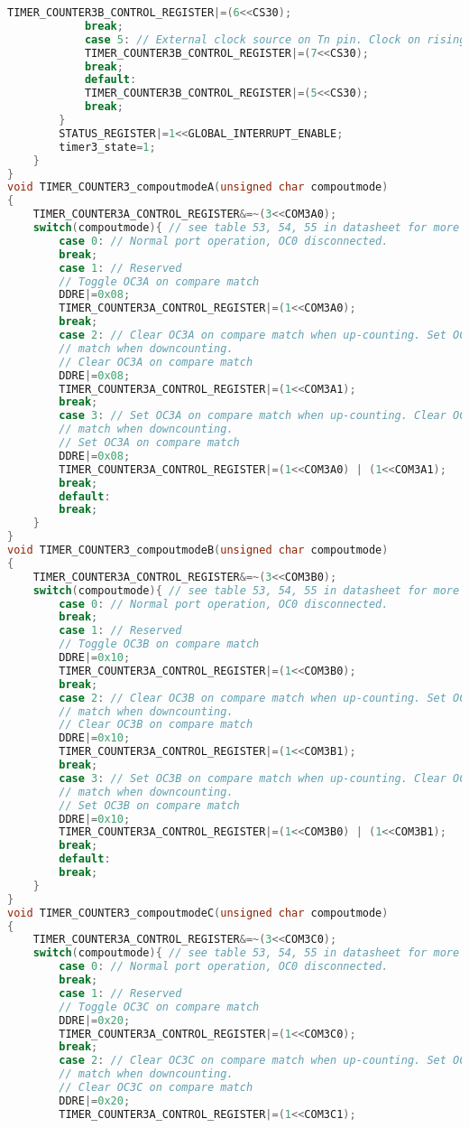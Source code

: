 \begin{lstlisting}[language=C]
			TIMER_COUNTER3B_CONTROL_REGISTER|=(6<<CS30);
			break;
			case 5: // External clock source on Tn pin. Clock on rising edge
			TIMER_COUNTER3B_CONTROL_REGISTER|=(7<<CS30);
			break;
			default:
			TIMER_COUNTER3B_CONTROL_REGISTER|=(5<<CS30);
			break;
		}
		STATUS_REGISTER|=1<<GLOBAL_INTERRUPT_ENABLE;
		timer3_state=1;
	}	
}
void TIMER_COUNTER3_compoutmodeA(unsigned char compoutmode)
{
	TIMER_COUNTER3A_CONTROL_REGISTER&=~(3<<COM3A0);
	switch(compoutmode){ // see table 53, 54, 55 in datasheet for more information
		case 0: // Normal port operation, OC0 disconnected.
		break;
		case 1: // Reserved
		// Toggle OC3A on compare match
		DDRE|=0x08;
		TIMER_COUNTER3A_CONTROL_REGISTER|=(1<<COM3A0);
		break;
		case 2: // Clear OC3A on compare match when up-counting. Set OC0 on compare
		// match when downcounting.
		// Clear OC3A on compare match
		DDRE|=0x08;
		TIMER_COUNTER3A_CONTROL_REGISTER|=(1<<COM3A1);
		break;
		case 3: // Set OC3A on compare match when up-counting. Clear OC0 on compare
		// match when downcounting.
		// Set OC3A on compare match
		DDRE|=0x08;
		TIMER_COUNTER3A_CONTROL_REGISTER|=(1<<COM3A0) | (1<<COM3A1);
		break;
		default:
		break;
	}
}
void TIMER_COUNTER3_compoutmodeB(unsigned char compoutmode)
{
	TIMER_COUNTER3A_CONTROL_REGISTER&=~(3<<COM3B0);
	switch(compoutmode){ // see table 53, 54, 55 in datasheet for more information
		case 0: // Normal port operation, OC0 disconnected.
		break;
		case 1: // Reserved
		// Toggle OC3B on compare match
		DDRE|=0x10;
		TIMER_COUNTER3A_CONTROL_REGISTER|=(1<<COM3B0);
		break;
		case 2: // Clear OC3B on compare match when up-counting. Set OC0 on compare
		// match when downcounting.
		// Clear OC3B on compare match
		DDRE|=0x10;
		TIMER_COUNTER3A_CONTROL_REGISTER|=(1<<COM3B1);
		break;
		case 3: // Set OC3B on compare match when up-counting. Clear OC0 on compare
		// match when downcounting.
		// Set OC3B on compare match
		DDRE|=0x10;
		TIMER_COUNTER3A_CONTROL_REGISTER|=(1<<COM3B0) | (1<<COM3B1);
		break;
		default:
		break;
	}
}
void TIMER_COUNTER3_compoutmodeC(unsigned char compoutmode)
{
	TIMER_COUNTER3A_CONTROL_REGISTER&=~(3<<COM3C0);
	switch(compoutmode){ // see table 53, 54, 55 in datasheet for more information
		case 0: // Normal port operation, OC0 disconnected.
		break;
		case 1: // Reserved
		// Toggle OC3C on compare match
		DDRE|=0x20;
		TIMER_COUNTER3A_CONTROL_REGISTER|=(1<<COM3C0);
		break;
		case 2: // Clear OC3C on compare match when up-counting. Set OC0 on compare
		// match when downcounting.
		// Clear OC3C on compare match
		DDRE|=0x20;
		TIMER_COUNTER3A_CONTROL_REGISTER|=(1<<COM3C1);

\end{lstlisting}
